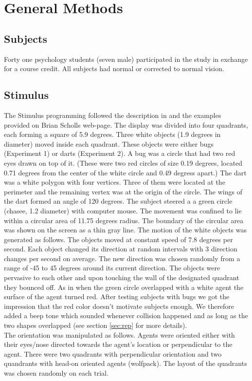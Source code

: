 \documentclass[10pt]{article}
\begin{document}
\section*{General Methods}
\subsection*{Subjects}
Forty one psychology students (seven male) participated in the study in exchange for a course credit.
All subjects had normal or corrected to normal vision.

\subsection*{Stimulus}
The Stimulus programming followed the description in \cite{gao10} and the examples provided on Brian Scholls web-page. 
The display was divided into four quadrants, each forming a square of 5.9 degrees. 
Three white objects (1.9 degrees in diameter) moved inside each quadrant. 
These objects were either bugs (Experiment 1) or darts (Experiment 2). 
A bug was a circle that had two red eyes drawn on top of it. 
(These were two red circles of size 0.19 degrees, located 0.71 degrees from the center of the white circle and 0.49 degress apart.) 
The dart was a white polygon with four vertices. 
Three of them were located at the perimeter and the remaining vertex was at the origin of the circle. 
The wings of the dart formed an angle of 120 degrees.
The subject steered a a green circle (chasee, 1.2 diameter) with computer mouse. 
The movement was confined to lie within a circular area of 11.75 degrees radius. 
The boundary of the circular area was shown on the screen as a thin gray line. 
The motion of the white objects was generated as follows. 
The objects moved at constant speed of 7.8 degrees per second. 
Each object changed its direction at random intervals with 3 direction changes per second on average. 
The new direction was chosen randomly from a range of -45 to 45 degrees around its current direction. 
The objects were pervasive to each other and upon touching the wall of the designated quadrant they bounced off. 
As in \cite{gao10} when the green circle overlapped with a white agent the surface of the agent turned red. 
After testing subjects with bugs we got the impression that the red color doesn't motivate subjects enough. 
We therefore added a beep tone which sounded whenever collision happened and as long as the two shapes overlapped (see section \ref{sec:rep} for more details).\\
The orientation was manipulated as follows. 
Agents were oriented either with their eyes/nose directed towards the agent's location or perpendicular to the agent. 
There were two quadrants with perpendicular orientation and two quandrants with head-on oriented agents (wolfpack). 
The layout of the quadrants was chosen randomly on each trial. \\
\end{document}
